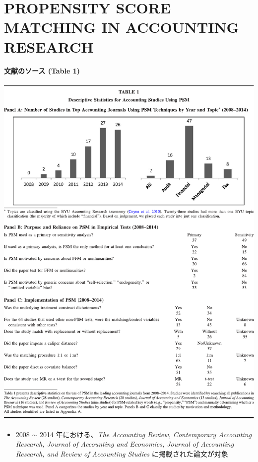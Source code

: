 \section{PROPENSITY SCORE MATCHING IN ACCOUNTING RESEARCH}

\paragraph{文献のソース (Table 1)}

\begin{table}
 \centering
 \includegraphics[width=14cm]{../table/tbl01.pdf}
\end{table}

\begin{itemize}
 \item 2008 $\sim$ 2014 年における、\textit{The Accounting Review,
       Contemporary Accounting Research, Journal of Accounting and
       Economics, Journal of Accounting Research, and Review of
       Accounting Studies} に掲載された論文が対象
\end{itemize}